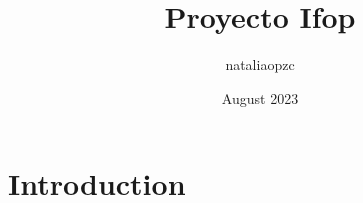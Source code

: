 \documentclass{article}
\title{Proyecto Ifop}
\author{nataliaopzc }
\date{August 2023}
\begin{document}
\maketitle

\section{Introduction}
\end{document}
